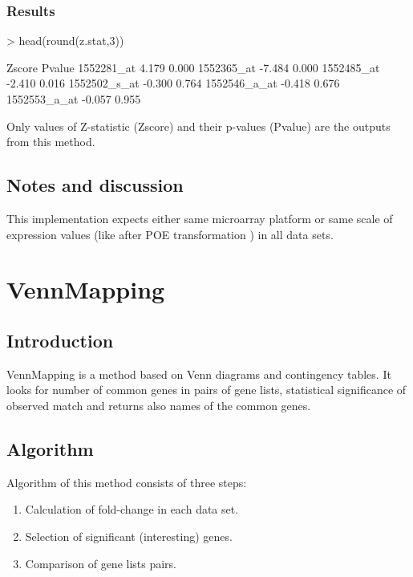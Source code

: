 \documentclass[a4paper]{report}
\begin{document}
\subsection*{Results}
\begin{Schunk}
\begin{Sinput}
> head(round(z.stat,3))
\end{Sinput}
\begin{Soutput}
             Zscore Pvalue
1552281_at    4.179  0.000
1552365_at   -7.484  0.000
1552485_at   -2.410  0.016
1552502_s_at -0.300  0.764
1552546_a_at -0.418  0.676
1552553_a_at -0.057  0.955
\end{Soutput}
\end{Schunk}
Only values of Z-statistic ({\ttfamily Zscore}) and their p-values ({\ttfamily Pvalue}) are the outputs from this method.
\section*{Notes and discussion}
This implementation expects either same microarray platform or same scale of expression values (like after POE transformation \cite{metaArray}) in all data sets.
         
          
\chapter{VennMapping}
\section*{Introduction}
VennMapping \cite{Smid} is a method based on Venn diagrams and contingency tables. It looks for number of common genes in pairs of gene lists, statistical significance of observed match and returns also names of the common genes.
\section*{Algorithm}
Algorithm of this method consists of three steps:
\begin{enumerate}
\item Calculation of fold-change in each data set.
\item Selection of significant (interesting) genes.
\item Comparison of gene lists pairs.
\end{enumerate}
\end{document}
